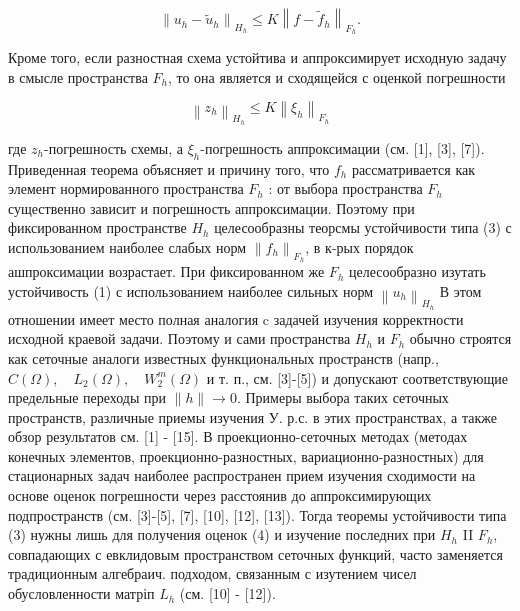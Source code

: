 \documentclass[10pt]{article}
\begin{document}
\[

\left\|u_{h}-\tilde{u}_{h}\right\|_{H_{h}} \leqslant K\left\|f-\tilde{f}_{h}\right\|_{F_{h}} .

\]



Кроме того, если разностная схема устойтива и аппроксимирует исходную задачу в смысле пространства $F_{h}$, то она является и сходящейся с оценкой погрешности



\[

\left\|z_{h}\right\|_{H_{h}} \leqslant K\left\|\xi_{h}\right\|_{F_{h}}

\]



где $z_{h}$-погрешность схемы, а $\xi_{h}$-погрешность аппроксимации (см. [1], [3], [7]). Приведенная теорема объясняет и причину того, что $f_{h}$ рассматривается как элемент нормированного пространства $F_{h}$ : от выбора пространства $F_{h}$ существенно зависит и погрешность аппроксимации. Поэтому при фиксированном пространстве $H_{h}$ целесообразны теорсмы устойчивости типа (3) с использованием наиболее слабых норм $\left\|f_{h}\right\|_{F_{h}}$, в к-рых порядок ашпроксимации возрастает. При фиксированном же $F_{h}$ целесообразно изутать устойчивость (1) с использованием наиболее сильных норм $\left\|u_{h}\right\|_{H_{h}}$ В этом отношении имеет место полная аналогия $\mathrm{c}$ задачей изучения корректности исходной краевой задачи. Поэтому и сами пространства $H_{h}$ и $F_{h}$ обычно строятся как сеточные аналоги известных функциональных пространств (напр., $C(\Omega), \quad L_{2}(\Omega), \quad W_{2}^{m}(\Omega)$ и т. п., см. [3]-[5]) и допускают соответствующие предельные переходы при $\|h\| \longrightarrow 0$. Примеры выбора таких сеточных пространств, различные приемы изучения У. р.с. в этих пространствах, а также обзор результатов см. [1] - [15]. В проекционно-сеточных методах (методах конечных элементов, проекционно-разностных, вариационно-разностных) для стационарных задач наиболее распространен прием изучения сходимости на основе оценок погрешности через расстоянив до аппроксимирующих подпространств (см. [3]-[5], [7], [10], [12], [13]). Тогда теоремы устойчивости типа (3) нужны лишь для получения оценок (4) и изучение последних при $H_{h}$ II $F_{h}$, совпадающих с евклидовым пространством сеточных функций, часто заменяется традиционным алгебраич. подходом, связанным с изутением чисел обусловленности матріп $L_{h}$ (см. [10] - [12]).
\end{document}
